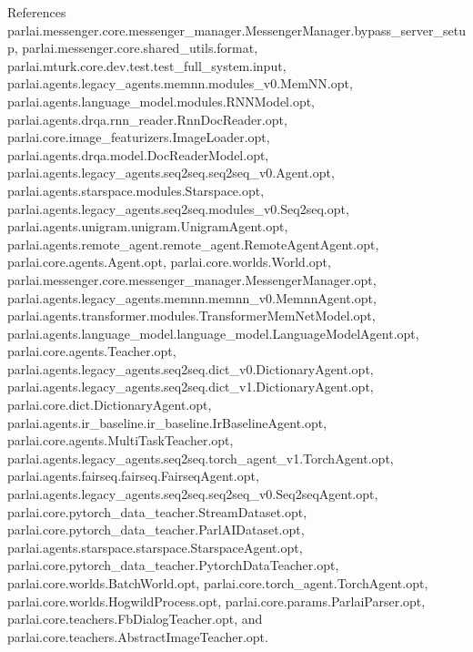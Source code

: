References parlai.\+messenger.\+core.\+messenger\+\_\+manager.\+Messenger\+Manager.\+bypass\+\_\+server\+\_\+setup, parlai.\+messenger.\+core.\+shared\+\_\+utils.\+format, parlai.\+mturk.\+core.\+dev.\+test.\+test\+\_\+full\+\_\+system.\+input, parlai.\+agents.\+legacy\+\_\+agents.\+memnn.\+modules\+\_\+v0.\+Mem\+N\+N.\+opt, parlai.\+agents.\+language\+\_\+model.\+modules.\+R\+N\+N\+Model.\+opt, parlai.\+agents.\+drqa.\+rnn\+\_\+reader.\+Rnn\+Doc\+Reader.\+opt, parlai.\+core.\+image\+\_\+featurizers.\+Image\+Loader.\+opt, parlai.\+agents.\+drqa.\+model.\+Doc\+Reader\+Model.\+opt, parlai.\+agents.\+legacy\+\_\+agents.\+seq2seq.\+seq2seq\+\_\+v0.\+Agent.\+opt, parlai.\+agents.\+starspace.\+modules.\+Starspace.\+opt, parlai.\+agents.\+legacy\+\_\+agents.\+seq2seq.\+modules\+\_\+v0.\+Seq2seq.\+opt, parlai.\+agents.\+unigram.\+unigram.\+Unigram\+Agent.\+opt, parlai.\+agents.\+remote\+\_\+agent.\+remote\+\_\+agent.\+Remote\+Agent\+Agent.\+opt, parlai.\+core.\+agents.\+Agent.\+opt, parlai.\+core.\+worlds.\+World.\+opt, parlai.\+messenger.\+core.\+messenger\+\_\+manager.\+Messenger\+Manager.\+opt, parlai.\+agents.\+legacy\+\_\+agents.\+memnn.\+memnn\+\_\+v0.\+Memnn\+Agent.\+opt, parlai.\+agents.\+transformer.\+modules.\+Transformer\+Mem\+Net\+Model.\+opt, parlai.\+agents.\+language\+\_\+model.\+language\+\_\+model.\+Language\+Model\+Agent.\+opt, parlai.\+core.\+agents.\+Teacher.\+opt, parlai.\+agents.\+legacy\+\_\+agents.\+seq2seq.\+dict\+\_\+v0.\+Dictionary\+Agent.\+opt, parlai.\+agents.\+legacy\+\_\+agents.\+seq2seq.\+dict\+\_\+v1.\+Dictionary\+Agent.\+opt, parlai.\+core.\+dict.\+Dictionary\+Agent.\+opt, parlai.\+agents.\+ir\+\_\+baseline.\+ir\+\_\+baseline.\+Ir\+Baseline\+Agent.\+opt, parlai.\+core.\+agents.\+Multi\+Task\+Teacher.\+opt, parlai.\+agents.\+legacy\+\_\+agents.\+seq2seq.\+torch\+\_\+agent\+\_\+v1.\+Torch\+Agent.\+opt, parlai.\+agents.\+fairseq.\+fairseq.\+Fairseq\+Agent.\+opt, parlai.\+agents.\+legacy\+\_\+agents.\+seq2seq.\+seq2seq\+\_\+v0.\+Seq2seq\+Agent.\+opt, parlai.\+core.\+pytorch\+\_\+data\+\_\+teacher.\+Stream\+Dataset.\+opt, parlai.\+core.\+pytorch\+\_\+data\+\_\+teacher.\+Parl\+A\+I\+Dataset.\+opt, parlai.\+agents.\+starspace.\+starspace.\+Starspace\+Agent.\+opt, parlai.\+core.\+pytorch\+\_\+data\+\_\+teacher.\+Pytorch\+Data\+Teacher.\+opt, parlai.\+core.\+worlds.\+Batch\+World.\+opt, parlai.\+core.\+torch\+\_\+agent.\+Torch\+Agent.\+opt, parlai.\+core.\+worlds.\+Hogwild\+Process.\+opt, parlai.\+core.\+params.\+Parlai\+Parser.\+opt, parlai.\+core.\+teachers.\+Fb\+Dialog\+Teacher.\+opt, and parlai.\+core.\+teachers.\+Abstract\+Image\+Teacher.\+opt.

